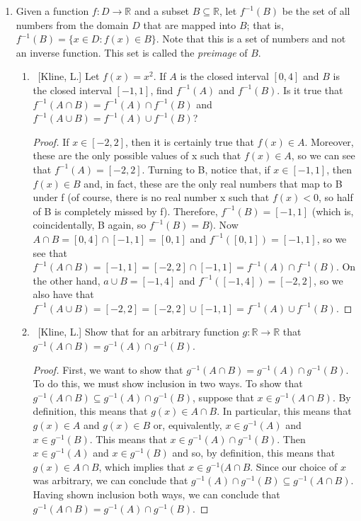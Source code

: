 \documentclass[10pt]{article}
\begin{document}
\begin{enumerate}
\begin{enumerate}
	\end{enumerate}
	
\item  Given a function $f: D \to \mathbb{R}$ and a subset $B \subseteq \mathbb{R}$, let $f^{-1}(B)$ be the set of all numbers from the domain $D$ that are mapped into $B$; that is, $f^{-1}(B) = \{ x \in D: f(x) \in B \}$.  Note that this is a set of numbers and not an inverse function.  This set is called the \emph{preimage} of $B$.

	\begin{enumerate}
	
	\item  ~[Kline, L.] Let $f(x) = x^2$.  If $A$ is the closed interval $[0,4]$ and $B$ is the closed interval $[-1,1]$, find $f^{-1}(A)$ and $f^{-1}(B)$.  Is it true that $f^{-1}(A \cap B) = f^{-1}(A) \cap f^{-1}(B)$ and $f^{-1}(A \cup B) = f^{-1}(A) \cup f^{-1}(B)$?
  \begin{proof}
If $x \in [-2,2]$, then it is certainly true that $f(x) \in A$.  Moreover, these are the only possible values of x such that $f(x) \in A$, so we can see that $f^{-1}(A) = [-2,2]$.  Turning to B, notice that, if $x \in [-1,1]$, then $f(x) \in B$ and, in fact, these are the only real numbers that map to B under f (of course, there is no real number x such that $f(x) < 0$, so half of B is completely missed by f). Therefore, $f^{-1}(B) = [-1,1]$ (which is, coincidentally, B again, so $f^{-1}(B) = B$).  Now $A \cap B = [0,4] \cap [-1,1] = [0,1]$ and $f^{-1}([0,1])=[-1,1]$, so we see that $f^{-1}(A \cap B) = [-1,1]=[-2,2] \cap [-1,1] = f^{-1}(A) \cap f^{-1}(B)$.  On the other hand, $a \cup B = [-1, 4]$ and $f^{-1}([-1,4]) = [-2,2]$, so we also have that $f^{-1}(A \cup B) = [-2,2]=[-2,2] \cup [-1,1] = f^{-1}(A) \cup f^{-1}(B)$.
 \end{proof}
	\item  ~[Kline, L.] Show that for an arbitrary function $g: \mathbb{R} \to \mathbb{R}$ that $g^{-1}(A \cap B) = g^{-1}(A) \cap g^{-1}(B)$.
\begin{proof}
First, we want to show that $g^{-1}(A \cap B) = g^{-1}(A) \cap g^{-1}(B)$. To do this, we must show inclusion in two ways.  To show that $g^{-1}(A \cap B) \subseteq g^{-1}(A) \cap g^{-1}(B)$, suppose that $x \in g^{-1}(A \cap B)$.  By definition, this means that $g(x) \in A \cap B$.  In particular, this means that $g(x) \in A$ and $g(x) \in B$ or, equivalently, $x \in g^{-1}(A)$ and $x \in g^{-1}(B)$.  This means that $x \in g^{-1}(A) \cap g^{-1}(B)$.  Then $x \in g^{-1}(A)$ and $x \in g^{-1}(B)$ and so, by definition, this means that $g(x) \in A \cap B$, which implies that $x \in g^{-1}(A \cap B$.  Since our choice of $x$ was arbitrary, we can conclude that $g^{-1}(A) \cap g^{-1}(B) \subseteq g^{-1}(A \cap B)$.  Having shown inclusion both ways, we can conclude that $g^{-1}(A \cap B) = g^{-1}(A) \cap g^{-1}(B)$.

\end{proof}
\end{enumerate}
\end{enumerate}
\end{document}
